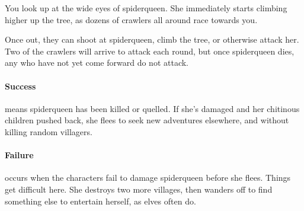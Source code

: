 \begin{boxtext}
  You look up at the wide eyes of \gls{spiderqueen}.
  She immediately starts climbing higher up the tree, as dozens of \glspl{crawler} all around race towards you.
\end{boxtext}

Once out, they can shoot at \gls{spiderqueen}, climb the tree, or otherwise attack her.
Two of the \glspl{crawler} will arrive to attack each round, but once \gls{spiderqueen} dies, any who have not yet come forward do not attack.

\keras

\showStdSpells



\spiderqueen

\showStdSpells[
  
  
  \setcounter{enc}{3}
]


\paragraph{Success} means \gls{spiderqueen} has been killed or quelled.
If she's damaged and her chitinous children pushed back, she flees to seek new adventures elsewhere, and without killing random villagers.

\paragraph{Failure} occurs when the characters fail to damage \gls{spiderqueen} before she flees.
Things get difficult here.
She destroys two more \glspl{village}, then wanders off to find something else to entertain herself, as elves often do.

